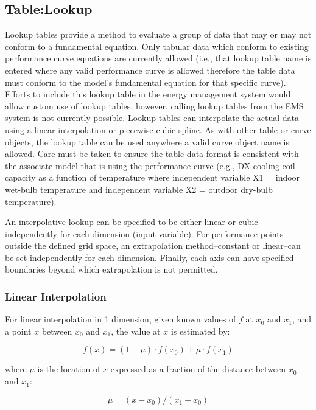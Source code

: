 \subsection{Table:Lookup}\label{table-lookup}

Lookup tables provide a method to evaluate a group of data that may or
may not conform to a fundamental equation. Only tabular data which
conform to existing performance curve equations are currently allowed
(i.e., that lookup table name is entered where any valid performance
curve is allowed therefore the table data must conform to the model's
fundamental equation for that specific curve). Efforts to include this
lookup table in the energy management system would allow custom use of
lookup tables, however, calling lookup tables from the EMS system is not
currently possible. Lookup tables can interpolate the actual data using
a linear interpolation or piecewise cubic spline. As with other table or
curve objects, the lookup table can be used anywhere a valid curve
object name is allowed. Care must be taken to ensure the table data
format is consistent with the associate model that is using the
performance curve (e.g., DX cooling coil capacity as a function of
temperature where independent variable X1 = indoor wet-bulb temperature
and independent variable X2 = outdoor dry-bulb temperature).

An interpolative lookup can be specified to be either linear or cubic
independently for each dimension (input variable). For performance
points outside the defined grid space, an extrapolation method--constant
or linear--can be set independently for each dimension. Finally, each
axis can have specified boundaries beyond which extrapolation is not
permitted.

\subsubsection{Linear Interpolation}\label{linear-interpolation}

For linear interpolation in 1 dimension, given known values of \(f\) at
\(x_0\) and \(x_1\), and a point \(x\) between \(x_0\) and \(x_1\), the
value at \(x\) is estimated by:

\[f\left(x\right) = \left(1-\mu\right) \cdot f\left(x_0\right) + \mu \cdot f\left(x_1\right)\]

where \(\mu\) is the location of \(x\) expressed as a fraction of the
distance between \(x_0\) and \(x_1\):

\[\mu = \left(x-x_0\right) / \left(x_1 - x_0\right)\]

